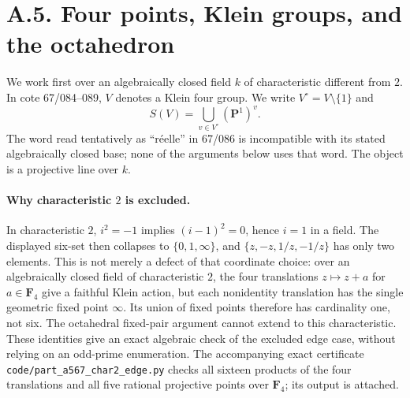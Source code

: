 \section{A.5. Four points, Klein groups, and the octahedron}
We work first over an algebraically closed field $k$ of characteristic different from $2$. In cote 67/084--089, $V$ denotes a Klein four group. We write $V^\circ=V\setminus\{1\}$ and
\[
 S(V)=\bigcup_{v\in V^\circ}(\mathbf P^1)^v.
\]
The word read tentatively as ``r\'eelle'' in 67/086 is incompatible with its stated algebraically closed base; none of the arguments below uses that word. The object is a projective line over $k$.

\paragraph{Why characteristic $2$ is excluded.}
In characteristic $2$, $i^2=-1$ implies $(i-1)^2=0$, hence $i=1$ in a field. The displayed six-set then collapses to $\{0,1,\infty\}$, and $\{z,-z,1/z,-1/z\}$ has only two elements. This is not merely a defect of that coordinate choice: over an algebraically closed field of characteristic $2$, the four translations $z\mapsto z+a$ for $a\in\mathbf F_4$ give a faithful Klein action, but each nonidentity translation has the single geometric fixed point $\infty$. Its union of fixed points therefore has cardinality one, not six. The octahedral fixed-pair argument cannot extend to this characteristic. These identities give an exact algebraic check of the excluded edge case, without relying on an odd-prime enumeration. The accompanying exact certificate \texttt{code/part\_a567\_char2\_edge.py} checks all sixteen products of the four translations and all five rational projective points over $\mathbf F_4$; its output is attached.

